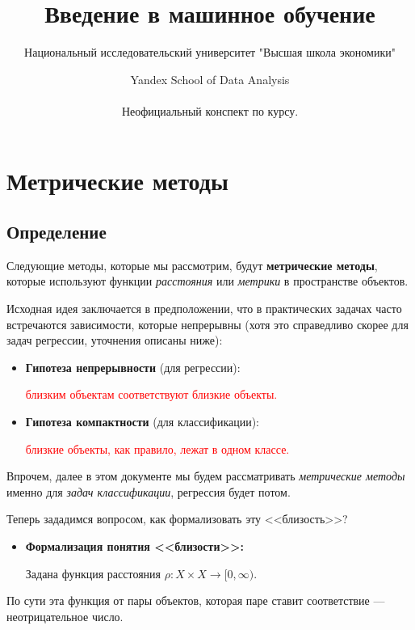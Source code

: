 \documentclass{article}
\title{Введение в машинное обучение}
\author{Национальный исследовательский университет "Высшая школа экономики" \and Yandex School of Data Analysis\\\\
Неофициальный конспект по курсу.}
\begin{document}
\maketitle
\tableofcontents
\newpage

\section{Метрические методы}
\subsection{Определение}
Следующие методы, которые мы рассмотрим, будут \textbf{метрические методы}, которые используют функции \textit{расстояния} или \textit{метрики} в пространстве объектов.

Исходная идея заключается в предположении, что в практических задачах часто встречаются зависимости, которые непрерывны (хотя это справедливо скорее для задач регрессии, уточнения описаны ниже):

\begin{itemize}
\item \textbf{Гипотеза непрерывности} (для регрессии):

\begin{center}
\textcolor{red}{близким объектам соответствуют близкие объекты.}
\end{center}

\item \textbf{Гипотеза компактности} (для классификации):

\begin{center}
\textcolor{red}{близкие объекты, как правило, лежат в одном классе.}
\end{center}

\end{itemize}

Впрочем, далее в этом документе мы будем рассматривать \textit{метрические методы} именно для \textit{задач классификации}, регрессия будет потом. 

Теперь зададимся вопросом, как формализовать эту <<близость>>?

\begin{itemize}
\item \textbf{Формализация понятия <<близости>>:}

\qquad Задана функция расстояния $\rho : X \times X \rightarrow [0, \infty)$.
\end{itemize}

По сути эта функция от пары объектов, которая паре ставит соответствие --- неотрицательное число.
\end{document}
